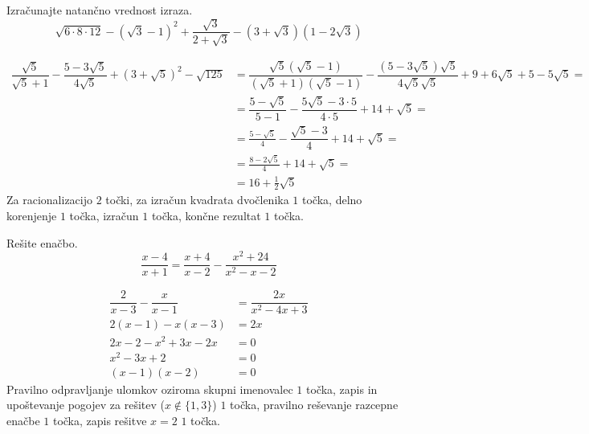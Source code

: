 \documentclass[addpoints]{exam}
\begin{document}
\begin{questions}


    \question[5]
    Izračunajte natančno vrednost izraza.
    $$ \sqrt{6\cdot 8\cdot 12}-\left(\sqrt{3}-1\right)^2+\dfrac{\sqrt{3}}{2+\sqrt{3}}-\left(3+\sqrt{3}\right)\left(1-2\sqrt{3}\right) $$

    \begin{solution}[7cm]
        \begin{align*} 
            \dfrac{\sqrt{5}}{\sqrt{5}+1}-\dfrac{5-3\sqrt{5}}{4\sqrt{5}}+\left(3+\sqrt{5}\right)^2-\sqrt{125}&=\dfrac{\sqrt{5}(\sqrt{5}-1)}{(\sqrt{5}+1)(\sqrt{5}-1)}-\dfrac{(5-3\sqrt{5})\sqrt{5}}{4\sqrt{5}\sqrt{5}}+9+6\sqrt{5}+5-5\sqrt{5}= \\
                                                                                                            &=\dfrac{5-\sqrt{5}}{5-1}-\dfrac{5\sqrt{5}-3\cdot 5}{4\cdot 5}+14+\sqrt{5}= \\
                                                                                                            &=\frac{5-\sqrt{5}}{4}-\dfrac{\sqrt{5}-3}{4}+14+\sqrt{5}= \\
                                                                                                            &=\frac{8-2\sqrt{5}}{4}+14+\sqrt{5}= \\
                                                                                                            &=16+\frac{1}{2}\sqrt{5}
        \end{align*}
        Za racionalizacijo $2$ točki, za izračun kvadrata dvočlenika $1$ točka, delno korenjenje $1$ točka, izračun $1$ točka, končne rezultat $1$ točka.
    \end{solution}
    
    

    \question[5]
    Rešite enačbo.
    $$ \dfrac{x-4}{x+1}=\dfrac{x+4}{x-2} - \dfrac{x^2+24}{x^2-x-2}$$
    
    
    \begin{solution}[4cm]
        \begin{align*} 
            \dfrac{2}{x-3}-\dfrac{x}{x-1} &=\dfrac{2x}{x^2-4x+3} \\
            2(x-1)-x(x-3) &= 2x \\
            2x-2-x^2+3x-2x &=0 \\
            x^2-3x+2 &=0 \\
            (x-1)(x-2) &=0
        \end{align*}
        Pravilno odpravljanje ulomkov oziroma skupni imenovalec $1$ točka, zapis in upoštevanje pogojev za rešitev ($x\notin\{1,3\}$) $1$ točka, pravilno reševanje razcepne enačbe $1$ točka, zapis rešitve $x=2$ $1$ točka.
    \end{solution}


\end{questions}
\end{document}
